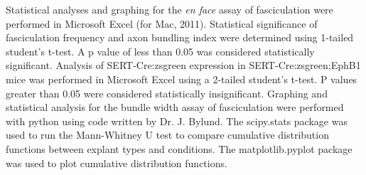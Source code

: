 Statistical analyses and graphing for the \emph{en face} assay of fasciculation were performed in Microsoft Excel (for Mac, 2011).
Statistical significance of fasciculation frequency and axon bundling index were determined using 1-tailed student's t-test.
A p value of less than 0.05 was considered statistically significant.
Analysis of SERT-Cre:zsgreen expression in SERT-Cre:zsgreen;EphB1 mice was performed in Microsoft Excel using a 2-tailed student's t-test.
P values greater than 0.05 were considered statistically insignificant.
Graphing and statistical analysis for the bundle width assay of fasciculation were performed with python using code written by Dr. J. Bylund.
The scipy.stats package was used to run the Mann-Whitney U test to compare cumulative distribution functions between explant types and conditions.
The matplotlib.pyplot package was used to plot cumulative distribution functions.